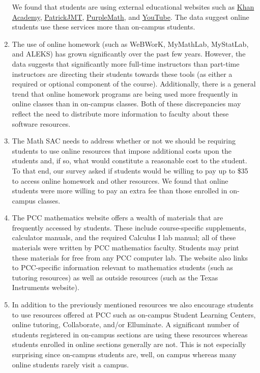 \begin{enumerate}[label=Q\arabic*.,font=\bf]
	      We found that students are using external educational websites such as \href{https://www.
		      khanacademy.org/}{Khan Academy},
	      \href{http://patrickjmt.com/}{PatrickJMT},
	      \href{http://www.purplemath.com/}{PurpleMath}, and
	      \href{http://www.youtube.com/}{YouTube}.
	      The data suggest online students use these services more than on-campus students.
	\item The use of online homework (such as WeBWorK,  MyMathLab, MyStatLab, and
	      ALEKS) has grown significantly over the past few years.
	      However, the data suggests that significantly more full-time instructors than part-time instructors are directing their students towards these tools (as either a required or optional component of the course).
	      Additionally, there is a general trend that online homework programs are being used more frequently in online classes than in on-campus classes.
	      Both of these discrepancies may reflect the need to distribute more information to faculty about these software resources.
	\item The Math SAC needs to address whether or not we should be requiring
	      students to use online resources that impose additional costs upon the
	      students and, if so, what would constitute a reasonable cost to the
	      student.
	      To that end, our survey asked if students would be willing to pay up to \$35 to access online homework and other resources.
	      We found that online students were more willing to pay an extra fee than those enrolled in on-campus classes.
	      \setcounter{enumi}{6}
	\item The PCC mathematics website offers a wealth of materials that are
	      frequently accessed by students.
	      These include course-specific supplements, calculator manuals, and the required Calculus I lab manual; all of these materials were written by PCC mathematics faculty.
	      Students may print these materials for free from any PCC computer lab.
	      The website also links to PCC-specific information relevant to mathematics students (such as tutoring resources) as well as outside resources (such as the Texas Instruments website).
	      \setcounter{enumi}{8}
	\item In addition to the previously mentioned resources we also encourage
	      students to use resources offered at PCC such as on-campus Student Learning
	      Centers, online tutoring, Collaborate, and/or Elluminate.
	      A significant number of students registered in on-campus sections are using these resources whereas students enrolled in online sections generally are not.
	      This is not especially surprising since on-campus students are, well, on campus whereas many online students rarely visit a campus.
\end{enumerate}


